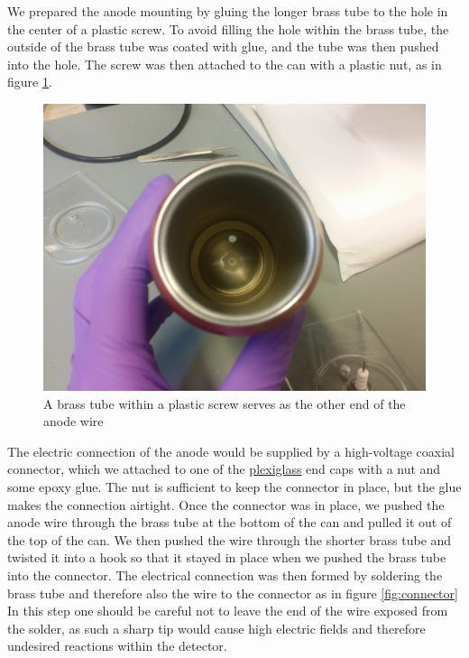 \documentclass[a4paper]{article}
\begin{document}
We prepared the anode mounting by gluing the longer brass tube 
to the hole in the center of a plastic screw.
To avoid filling the hole within the brass tube, the outside of the brass tube was coated with glue, and the tube was then pushed into the hole.
The screw was then attached to the can with a plastic nut, as in figure \ref{fig:anode_mounting}.

\begin{figure}[ht!]
\centering
\includegraphics[width=\textwidth]{fig/IMG_20201123_103327.jpg}
\caption{A brass tube within a plastic screw serves as the other end of the anode wire}
\label{fig:anode_mounting}
\end{figure}

The electric connection of the anode would be supplied by a high-voltage coaxial connector, which we attached to one of the
\href{https://en.wikipedia.org/wiki/Poly(methyl_methacrylate)}{plexiglass}
end caps with a nut and some epoxy glue.
The nut is sufficient to keep the connector in place, but the glue makes the connection airtight.
Once the connector was in place, we pushed the anode wire through the brass tube at the bottom of the can and pulled it out of the top of the can.
We then pushed the wire through the shorter brass tube and twisted it into a hook so that it stayed in place when we pushed the brass tube into the connector.
The electrical connection was then formed by soldering the brass tube and therefore also the wire to the connector as in figure \ref{fig:connector}
In this step one should be careful not to leave the end of the wire exposed from the solder, as such a sharp tip would cause high electric fields and therefore undesired reactions within the detector.
\end{document}
